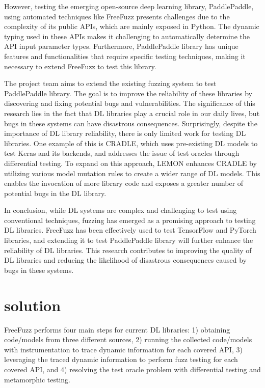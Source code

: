 \documentclass[sigconf]{acmart}
\begin{document}
\par However, testing the emerging open-source deep learning library, PaddlePaddle, using automated techniques like FreeFuzz presents challenges due to the complexity of its public APIs, which are mainly exposed in Python. The dynamic typing used in these APIs makes it challenging to automatically determine the API input parameter types. Furthermore, PaddlePaddle library has unique features and functionalities that require specific testing techniques, making it necessary to extend FreeFuzz to test this library.
\par The project team aims to extend the existing fuzzing system to test PaddlePaddle library. The goal is to improve the reliability of these libraries by discovering and fixing potential bugs and vulnerabilities. The significance of this research lies in the fact that DL libraries play a crucial role in our daily lives, but bugs in these systems can have disastrous consequences. Surprisingly, despite the importance of DL library reliability, there is only limited work for testing DL libraries. One example of this is CRADLE, which uses pre-existing DL models to test Keras and its backends, and addresses the issue of test oracles through differential testing. To expand on this approach, LEMON enhances CRADLE by utilizing various model mutation rules to create a wider range of DL models. This enables the invocation of more library code and exposes a greater number of potential bugs in the DL library.
\par In conclusion, while DL systems are complex and challenging to test using conventional techniques, fuzzing has emerged as a promising approach to testing DL libraries. FreeFuzz has been effectively used to test TensorFlow and PyTorch libraries, and extending it to test PaddlePaddle library will further enhance the reliability of DL libraries. This research contributes to improving the quality of DL libraries and reducing the likelihood of disastrous consequences caused by bugs in these systems.



\section{solution}
FreeFuzz performs four main steps for current DL libraries: 1) obtaining code/models from three different sources, 2) running the collected code/models with instrumentation to trace dynamic information for each covered API, 3) leveraging the traced dynamic information to perform fuzz testing for each covered API, and 4) resolving the test oracle problem with differential testing and metamorphic testing.
\end{document}

